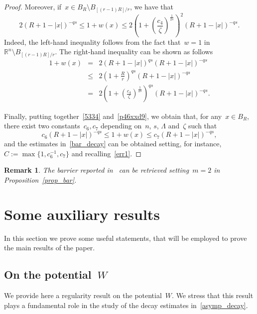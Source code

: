 \documentclass[10pt,a4paper]{amsart}
\newtheorem{rem}[theorem]{Remark}
\numberwithin{equation}{section}
\newcommand{\R}{\mathbb{R}}
\begin{document}
\begin{proof}
Moreover, if~$x \in B_R \setminus B_{[(r-1)R]/r}$, we have that
\begin{equation}\label{p46xxd9}
2 (R+1-|x |)^{-qs} \leq 1+w(x) \leq 2 \left( 1+\left(\frac{c_4}{\zeta}\right)^{\frac{1}{2s}} \right)^{2}  (R+1-|x |)^{-qs}.
\end{equation}
Indeed,
the left-hand inequality follows from the fact that~$w=1$ in~$\R^n\setminus B_{[(r-1)R]/r}$.
The right-hand inequality can be shown as follows
\begin{eqnarray*}
1+w(x)& = &2 (R+1-|x |)^{qs}(R+1-|x |)^{-qs}\\
&\leq & 2 \left(1+\frac{R}{r}\right)^{qs}  (R+1-|x |)^{-qs}\\
& = & 2 \left( 1+\left(\frac{c_4}{\zeta}\right)^{\frac{1}{2s}} \right)^{qs}  (R+1-|x |)^{-qs}.
\end{eqnarray*}

Finally, putting together~\eqref{5334} and~\eqref{p46xxd9}, we obtain that, for any~$x \in B_R$, there exist two constants~$c_6,c_7$ depending on~$n$, $s$, $\Lambda$ and~$\zeta$ such that
\begin{equation*}
c_6 (R+1-|x |)^{-qs} \leq 1+w(x) \leq c_7 (R+1-|x |)^{-qs},
\end{equation*}
and the estimates in~\eqref{bar_decay} can be obtained setting, for instance, $C:=\max\{1,c_6^{-1},c_7\}$
and recalling~\eqref{err1}.
\end{proof}

\begin{rem}
{\rm
The barrier reported in~\cite[Lemma 4.1]{CP16} can be retrieved setting~$m=2$ in Proposition~\ref{prop_bar}.
}
\end{rem}
   
     \section{Some auxiliary results}\label{barr_comp}
     In this section we prove some useful statements, that will be employed to prove the main results of the paper.
     
\subsection{On the potential~$W$}\label{otpot}

We provide here a regularity result on the potential~$W$. We stress that this result plays a fundamental role in the study of the decay estimates in~\eqref{asymp_decay}. 
\end{document}

